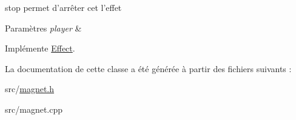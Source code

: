 stop permet d'arrêter cet l'effet 


\begin{DoxyParams}{Paramètres}
{\em player} & \\
\hline
\end{DoxyParams}


Implémente \hyperlink{class_effect_ac8b826d884bfdfc41a2286bcbb4c7dab}{Effect}.



La documentation de cette classe a été générée à partir des fichiers suivants \+:\begin{DoxyCompactItemize}
\item 
src/\hyperlink{magnet_8h}{magnet.\+h}\item 
src/magnet.\+cpp\end{DoxyCompactItemize}
